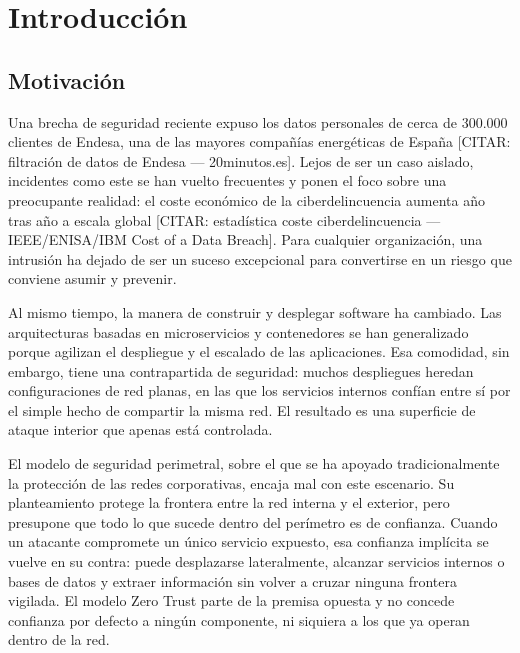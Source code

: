 \documentclass[11pt,spanish,listoffigures,listoftables]{tfgetsinf}
\begin{document}

\mainmatter


\chapter{Introducci\'on}
    \section{Motivaci\'on}
    Una brecha de seguridad reciente expuso los datos personales de cerca de 300.000 clientes de Endesa, una de las mayores compañías energéticas de España [CITAR: filtración de datos de Endesa — 20minutos.es]. Lejos de ser un caso aislado, incidentes como este se han vuelto frecuentes y ponen el foco sobre una preocupante realidad: el coste económico de la ciberdelincuencia aumenta año tras año a escala global [CITAR: estadística coste ciberdelincuencia — IEEE/ENISA/IBM Cost of a Data Breach]. Para cualquier organización, una intrusión ha dejado de ser un suceso excepcional para convertirse en un riesgo que conviene asumir y prevenir.

    Al mismo tiempo, la manera de construir y desplegar software ha cambiado. Las arquitecturas basadas en microservicios y contenedores se han generalizado porque agilizan el despliegue y el escalado de las aplicaciones. Esa comodidad, sin embargo, tiene una contrapartida de seguridad: muchos despliegues heredan configuraciones de red planas, en las que los servicios internos confían entre sí por el simple hecho de compartir la misma red. El resultado es una superficie de ataque interior que apenas está controlada.
    
    El modelo de seguridad perimetral, sobre el que se ha apoyado tradicionalmente la protección de las redes corporativas, encaja mal con este escenario. Su planteamiento protege la frontera entre la red interna y el exterior, pero presupone que todo lo que sucede dentro del perímetro es de confianza. Cuando un atacante compromete un único servicio expuesto, esa confianza implícita se vuelve en su contra: puede desplazarse lateralmente, alcanzar servicios internos o bases de datos y extraer información sin volver a cruzar ninguna frontera vigilada. El modelo Zero Trust parte de la premisa opuesta y no concede confianza por defecto a ningún componente, ni siquiera a los que ya operan dentro de la red.
    
\end{document}
